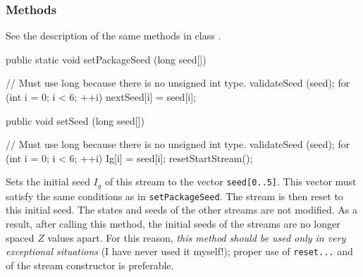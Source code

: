 \subsubsection* {Methods}
See the description of the same methods in class .
\begin{code}

   public static void setPackageSeed (long seed[]) \begin{hide} {
      // Must use long because there is no unsigned int type.
      validateSeed (seed);
      for (int i = 0; i < 6;  ++i)
         nextSeed[i] = seed[i];
   }\end{hide}
\end{code}
\iffalse
  \begin{tabb}  Sets the initial seed for the class \texttt{MRG32k3aL} to the
   six integers in the vector \texttt{seed[0..5]}.
   This will be the seed (initial state) of the first stream.
   If this method is not called, the default initial seed
   is $(12345, 12345, 12345, 12345, 12345, 12345)$.
   If it is called, the first 3 values of the seed must all be
   less than $m_1 = 4294967087$, and not all 0;
   and the last 3 values
   must all be less than $m_2 = 4294944443$, and not all 0.
 \end{tabb}
\fi
\begin{htmlonly}
\end{htmlonly}
\begin{code}

   public void setSeed (long seed[]) \begin{hide} {
      // Must use long because there is no unsigned int type.
      validateSeed (seed);
      for (int i = 0; i < 6;  ++i)
         Ig[i] = seed[i];
      resetStartStream();
   }\end{hide}
\end{code}
\iffalse
 \begin{tabb}  Sets the initial seed $I_g$ of this stream
  to the vector \texttt{seed[0..5]}.  This vector must satisfy the same
  conditions as in \texttt{setPackageSeed}.
  The stream is then reset to this initial seed.
  The states and seeds of the other streams are not modified.
  As a result, after calling this method, the initial seeds
  of the streams are no longer spaced $Z$ values apart.
  For this reason, \emph{this method should be used only in very
  exceptional situations} (I have never used it myself!);
  proper use of \texttt{reset...}
  and of the stream constructor is preferable.
 \end{tabb}
